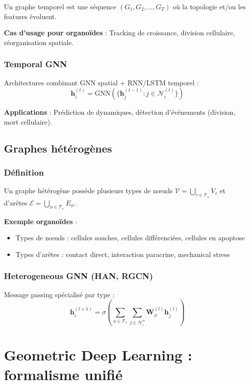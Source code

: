 Un graphe temporel est une séquence $(G_1, G_2, \ldots, G_T)$ où la topologie et/ou les features évoluent.

\textbf{Cas d'usage pour organoïdes} : Tracking de croissance, division cellulaire, réorganisation spatiale.

\subsubsection{Temporal GNN}

Architectures combinant GNN spatial + RNN/LSTM temporel :
\[
\mathbf{h}_i^{(t)} = \text{GNN}\left(\{\mathbf{h}_j^{(t-1)} : j \in \mathcal{N}_i^{(t)}\}\right)
\]

\textbf{Applications} : Prédiction de dynamiques, détection d'événements (division, mort cellulaire).

\subsection{Graphes hétérogènes}

\subsubsection{Définition}

Un graphe hétérogène possède plusieurs types de nœuds $\mathcal{V} = \bigcup_{\tau \in \mathcal{T}_v} V_\tau$ et d'arêtes $\mathcal{E} = \bigcup_{\phi \in \mathcal{T}_e} E_\phi$.

\textbf{Exemple organoïdes} :
\begin{itemize}
    \item Types de nœuds : cellules souches, cellules différenciées, cellules en apoptose
    \item Types d'arêtes : contact direct, interaction paracrine, mechanical stress
\end{itemize}

\subsubsection{Heterogeneous GNN (HAN, RGCN)}

Message passing spécialisé par type :
\[
\mathbf{h}_i^{(l+1)} = \sigma\left(\sum_{\phi \in \mathcal{T}_e} \sum_{j \in \mathcal{N}_i^\phi} \mathbf{W}_\phi^{(l)} \mathbf{h}_j^{(l)}\right)
\]

\section{Geometric Deep Learning : formalisme unifié}

